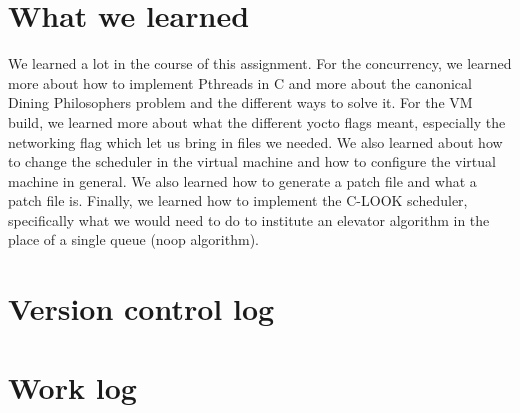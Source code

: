 \documentclass[letterpaper,10pt,titlepage]{article}
\begin{document}
\section{What we learned}
We learned a lot in the course of this assignment. For the concurrency, we learned more about how to implement Pthreads in C and more about the canonical Dining Philosophers problem and the different ways to solve it. For the VM build, we learned more about what the different yocto flags meant, especially the networking flag which let us bring in files we needed. We also learned about how to change the scheduler in the virtual machine and how to configure the virtual machine in general. We also learned how to generate a patch file and what a patch file is. Finally, we learned how to implement the C-LOOK scheduler, specifically what we would need to do to institute an elevator algorithm in the place of a single queue (noop algorithm).

\section{Version control log}
\begin{versionhistory}
\end{versionhistory}

\section{Work log}
\subsection{}

%
%
\end{document}
